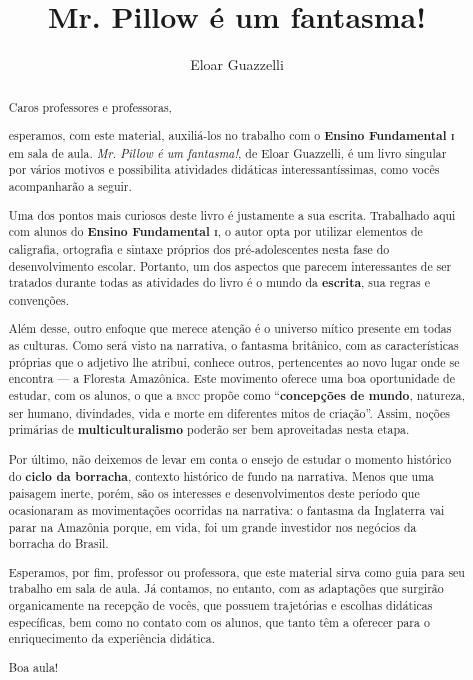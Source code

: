 \documentclass[11pt]{extarticle}
\newcommand{\AutorLivro}{Eloar Guazzelli}
\newcommand{\TituloLivro}{Mr. Pillow é um fantasma!}
\newcommand{\colaborador}{Renier Silva}
\begin{document}
\title{\TituloLivro}
\author{\AutorLivro}
\def\authornotes{\colaborador}

\date{}
\maketitle


\tableofcontents




\begin{abstract}

Caros professores e professoras, 

esperamos, com este material,
auxiliá-los no trabalho com o \textbf{Ensino Fundamental \textsc{i}} em sala de aula.
\textit{Mr. Pillow é um fantasma!}, de Eloar Guazzelli, é um livro singular
por vários motivos e possibilita atividades didáticas interessantíssimas,
como vocês acompanharão a seguir.

Uma dos pontos mais curiosos deste livro é justamente a sua escrita.
Trabalhado aqui com alunos do \textbf{Ensino Fundamental \textsc{i}},
o autor opta por utilizar elementos de caligrafia, ortografia e sintaxe 
próprios dos pré-adolescentes nesta fase do desenvolvimento escolar.
Portanto, um dos aspectos que parecem interessantes de ser tratados durante
todas as atividades do livro é o mundo da \textbf{escrita}, sua regras
e convenções.

Além desse, outro enfoque que merece atenção é o universo mítico presente
em todas as culturas. Como será visto na narrativa, o fantasma britânico,
com as características próprias que o adjetivo lhe atribui, conhece
outros, pertencentes ao novo lugar onde se encontra --- a Floresta Amazônica.
Este movimento oferece uma boa oportunidade de estudar, com os alunos, 
o que a \textsc{bncc} propõe como ``\textbf{concepções de mundo}, natureza, ser humano, 
divindades, vida e morte em diferentes mitos de criação''. Assim, 
noções primárias de \textbf{multiculturalismo} poderão ser bem aproveitadas
nesta etapa.

Por último, não deixemos de levar em conta o ensejo de estudar o momento
histórico do \textbf{ciclo da borracha}, contexto histórico de fundo 
na narrativa. Menos que uma paisagem inerte, porém, são os interesses
e desenvolvimentos deste período que ocasionaram as movimentações
ocorridas na narrativa: o fantasma da Inglaterra vai parar na Amazônia
porque, em vida, foi um grande investidor nos negócios da borracha do Brasil. 

Esperamos, por fim, professor ou professora, que este material sirva como guia 
para seu trabalho em sala de aula. Já contamos, no entanto, com as adaptações
que surgirão organicamente na recepção de vocês, que possuem 
trajetórias e escolhas didáticas específicas, bem como no contato com os 
alunos, que tanto têm a oferecer para o enriquecimento da experiência didática. 

Boa aula!

\end{abstract}
\end{document}
